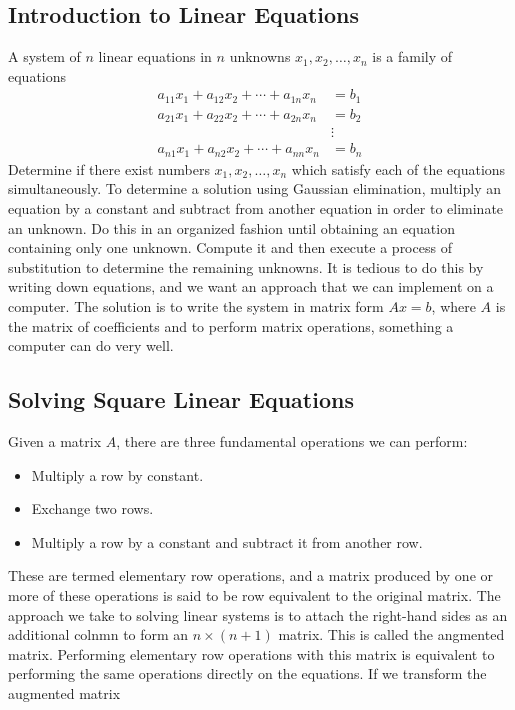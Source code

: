 \documentclass[../main.tex]{subfiles}
\begin{document}
\subsection*{Introduction to Linear Equations}
A system of $n$ linear equations in $n$ unknowns $x_{1}, x_{2}, \ldots, x_{n}$ is a family of equations
$$
\begin{aligned}
a_{11} x_{1}+a_{12} x_{2}+\cdots+a_{1 n} x_{n}&=b_{1} \\
a_{21} x_{1}+a_{22} x_{2}+\cdots+a_{2 n} x_{n}&=b_{2} \\
&\vdots \\
a_{n 1} x_{1}+a_{n 2} x_{2}+\cdots+a_{n n} x_{n}&=b_{n}
\end{aligned}
$$
Determine if there exist numbers $x_{1}, x_{2}, \ldots, x_{n}$ which satisfy each of the equations simultaneously. To determine a solution using Gaussian elimination, multiply an equation by a constant and subtract from another equation in order to eliminate an unknown. Do this in an organized fashion until obtaining an equation containing only one unknown. Compute it and then execute a process of substitution to determine the remaining unknowns. It is tedious to do this by writing down equations, and we want an approach that we can implement on a computer. The solution is to write the system in matrix form $A x=b$, where $A$ is the matrix of coefficients and to perform matrix operations, something a computer can do very well.

\subsection*{Solving Square Linear Equations}
Given a matrix $A$, there are three fundamental operations we can perform:
\begin{itemize}[noitemsep]
	\item  Multiply a row by constant.
	\item Exchange two rows.
	\item Multiply a row by a constant and subtract it from another row.
\end{itemize}

These are termed elementary row operations, and a matrix produced by one or more of these operations is said to be row equivalent to the original matrix. The approach we take to solving linear systems is to attach the right-hand sides as an additional colnmn to form an $n \times(n+1)$ matrix. This is called the angmented matrix. Performing elementary row operations with this matrix is equivalent to performing the same operations directly on the equations. If we transform the augmented matrix
\end{document}
